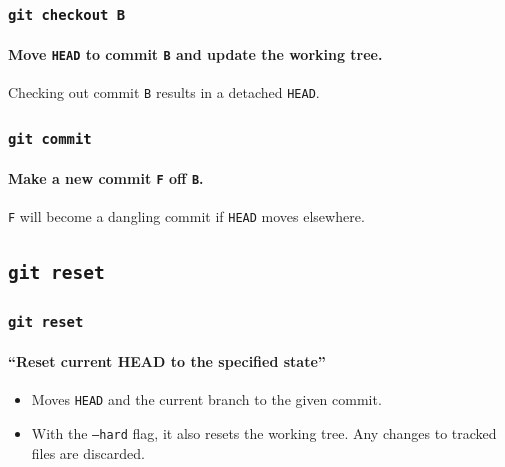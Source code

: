 \documentclass{beamer}
\newcommand\gitcmd[1]{\texttt{git #1}}
\newcommand\gflag[1]{\texttt{#1}}
\newcommand\grefspec[1]{\texttt{#1}}
\newcommand\gHEAD{\texttt{HEAD}}
\begin{document}
\begin{frame}
  \frametitle{\gitcmd{checkout B}}
  \framesubtitle{Move \gHEAD{} to commit \grefspec{B} and update the working tree.}
  \begin{figure}
    \centering
  \end{figure}

  Checking out commit \grefspec{B} results in a detached \gHEAD{}.
\end{frame}

\begin{frame}
  \frametitle{\gitcmd{commit}}
  \framesubtitle{Make a new commit \grefspec{F} off \grefspec{B}.}
  \begin{figure}
    \centering
  \end{figure}

  \grefspec{F} will become a dangling commit if \grefspec{HEAD} moves elsewhere.
\end{frame}

\subsection{\gitcmd{reset}}

\begin{frame}
  \frametitle{\gitcmd{reset}}
  \framesubtitle{``Reset current HEAD to the specified state''}

  \begin{itemize}
    \item Moves \gHEAD{} and the current branch to the given commit.
    \item With the \gflag{--hard} flag, it also resets the working tree.
      Any changes to tracked files are discarded.
  \end{itemize}
  \vfill
\end{frame}
\end{document}
